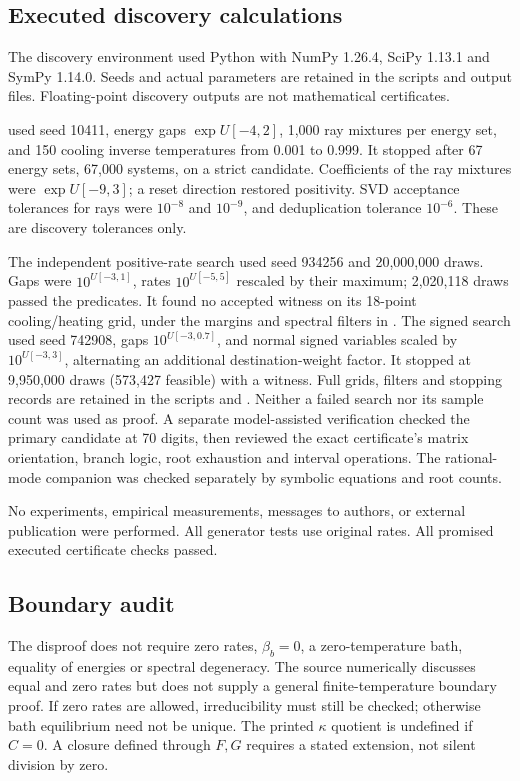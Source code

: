 \documentclass[11pt]{article}
\begin{document}
\subsection{Executed discovery calculations}
The discovery environment used Python with NumPy 1.26.4, SciPy 1.13.1 and SymPy 1.14.0. Seeds and actual parameters are retained in the scripts and output files. Floating-point discovery outputs are not mathematical certificates.

 used seed 10411, energy gaps $\exp U[-4,2]$, 1,000 ray mixtures per energy set, and 150 cooling inverse temperatures from 0.001 to 0.999. It stopped after 67 energy sets, 67,000 systems, on a strict candidate. Coefficients of the ray mixtures were $\exp U[-9,3]$; a reset direction restored positivity. SVD acceptance tolerances for rays were $10^{-8}$ and $10^{-9}$, and deduplication tolerance $10^{-6}$. These are discovery tolerances only.

The independent positive-rate search used seed 934256 and 20,000,000 draws. Gaps were $10^{U[-3,1]}$, rates $10^{U[-5,5]}$ rescaled by their maximum; 2,020,118 draws passed the predicates. It found no accepted witness on its 18-point cooling/heating grid, under the margins and spectral filters in . The signed search used seed 742908, gaps $10^{U[-3,0.7]}$, and normal signed variables scaled by $10^{U[-3,3]}$, alternating an additional destination-weight factor. It stopped at 9,950,000 draws (573,427 feasible) with a witness. Full grids, filters and stopping records are retained in the scripts and . Neither a failed search nor its sample count was used as proof. A separate model-assisted verification checked the primary candidate at 70 digits, then reviewed the exact certificate's matrix orientation, branch logic, root exhaustion and interval operations. The rational-mode companion was checked separately by symbolic equations and root counts.

No experiments, empirical measurements, messages to authors, or external publication were performed. All generator tests use original rates. All promised executed certificate checks passed.

\subsection{Boundary audit}
The disproof does not require zero rates, $\beta_b=0$, a zero-temperature bath, equality of energies or spectral degeneracy. The source numerically discusses equal and zero rates but does not supply a general finite-temperature boundary proof. If zero rates are allowed, irreducibility must still be checked; otherwise bath equilibrium need not be unique. The printed $\kappa$ quotient is undefined if $C=0$. A closure defined through $F,G$ requires a stated extension, not silent division by zero.
\end{document}
